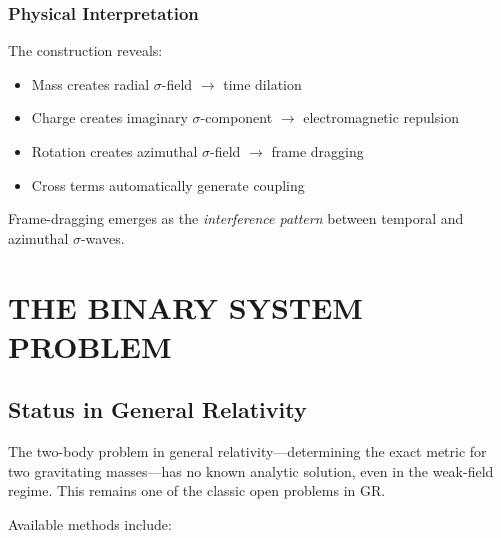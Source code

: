 \documentclass[11pt,a4paper]{article}
\theoremstyle{definition}
\theoremstyle{remark}
\begin{document}
	\subsubsection{Physical Interpretation}
	
	The construction reveals:
	\begin{itemize}
		\item Mass creates radial $\sigma$-field $\to$ time dilation
		\item Charge creates imaginary $\sigma$-component $\to$ electromagnetic repulsion
		\item Rotation creates azimuthal $\sigma$-field $\to$ frame dragging
		\item Cross terms automatically generate coupling
	\end{itemize}
	
	Frame-dragging emerges as the \emph{interference pattern} between temporal and azimuthal $\sigma$-waves.
	
	\section{THE BINARY SYSTEM PROBLEM}
	\label{sec:binary}
	
	\subsection{Status in General Relativity}
	
	The two-body problem in general relativity---determining the exact metric for two gravitating masses---has no known analytic solution, even in the weak-field regime. This remains one of the classic open problems in GR.
	
	Available methods include:
	
\end{document}
